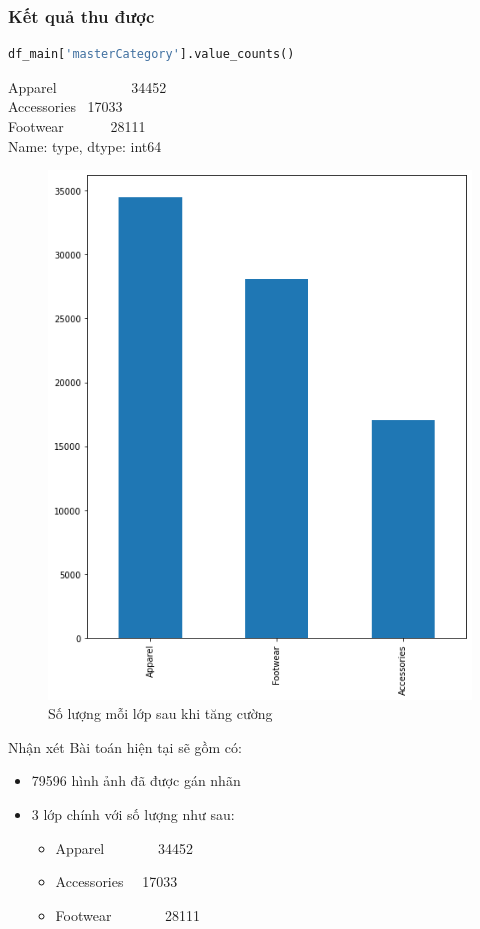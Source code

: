 \subsubsection{Kết quả thu được }
\begin{lstlisting}[language = python]
df_main['masterCategory'].value_counts()
\end{lstlisting}
Apparel    \ \ \ \ \ \ \ \ \ \ 34452\\
Accessories \   17033\\
Footwear    \ \ \ \ \ \  28111\\
Name: type, dtype: int64
\newpage
\begin{center}
    \begin{figure}[!h]
        \centering
        \includegraphics[scale = 0.6]{fileanh/50.png}
        \caption{Số lượng mỗi lớp sau khi tăng cường}
    \end{figure}
\end{center}

\begin{block}{Nhận xét}
Bài toán hiện tại sẽ gồm có:
\begin{itemize}
    \item 79596 hình ảnh đã được gán nhãn 
    \item 3 lớp chính với số lượng như sau:
    \begin{itemize}
        \item Apparel \ \ \ \ \ \ \ 34452
        \item Accessories \ \ 17033
        \item Footwear \ \ \ \ \ \ \ 28111
    \end{itemize}
\end{itemize}
\end{block}